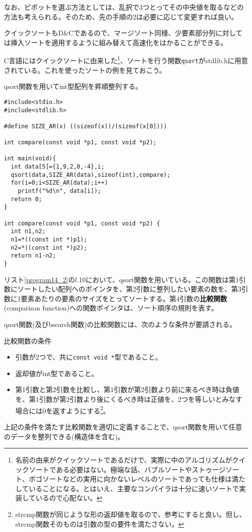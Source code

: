 なお、ピボットを選ぶ方法としては、乱択で3つとってその中央値を取るなどの方法も考えられる。そのため、先の手順の2は必要に応じて変更すれば良い。

クイックソートもD\&Cであるので、マージソート同様、少要素部分列に対しては挿入ソートを適用するように組み替えて高速化をはかることができる。

C言語にはクイックソートに由来した\footnote{名前の由来がクイックソートであるだけで、実際に中のアルゴリズムがクイックソートである必要はない。極端な話、バブルソートやストゥージソート、ボゴソートなどの実用に向かないレベルのソートであっても仕様は満たしていることになる。とはいえ、主要なコンパイラは十分に速いソートで実装しているので心配ない。}、ソートを行う関数\verb|qsort|がstdlib.hに用意されている。これを使ったソートの例を見ておこう。
\begin{boxnote}
qsort関数を用いてint型配列を昇順整列する。
\begin{lstlisting}[caption=qsort関数の例,label=program14_2]
#include<stdio.h>
#include<stdlib.h>

#define SIZE_AR(x) ((sizeof(x))/(sizeof(x[0])))

int compare(const void *p1, const void *p2);

int main(void){
  int data[5]={1,9,2,0,-4},i;
  qsort(data,SIZE_AR(data),sizeof(int),compare);
  for(i=0;i<SIZE_AR(data);i++)
    printf("%d\n", data[i]);
  return 0;
}

int compare(const void *p1, const void *p2) {
  int n1,n2;
  n1=*((const int *)p1);
  n2=*((const int *)p2);
  return n1-n2;
}
\end{lstlisting}
\end{boxnote}

リスト\ref{program14_2}の$l$.10において、qsort関数を用いている。この関数は第1引数にソートしたい配列へのポインタを、第2引数に整列したい要素の数を、第3引数に1要素あたりの要素のサイズをとってソートする。第4引数の\textbf{比較関数}(comparison function)への関数ポインタは、ソート順序の規則を表す。

qsort関数(及びbsearch関数)の比較関数には、次のような条件が要請される。
\begin{itembox}[l]{比較関数の条件}
\begin{itemize}
\item 引数が2つで、共に\verb|const void *|型であること。
\item 返却値がint型であること。
\item 第1引数と第2引数を比較し、第1引数が第2引数より前に来るべき時は負値を、第1引数が第2引数より後にくるべき時は正値を、2つを等しいとみなす場合には0を返すようにする\footnote{strcmp関数が同じような形の返却値を取るので、参考にすると良い。但し、strcmp関数そのものは引数の型の要件を満たさない。}。
\end{itemize}
\end{itembox}
上記の条件を満たす比較関数を適切に定義することで、qsort関数を用いて任意のデータを整列できる(構造体を含む)。

